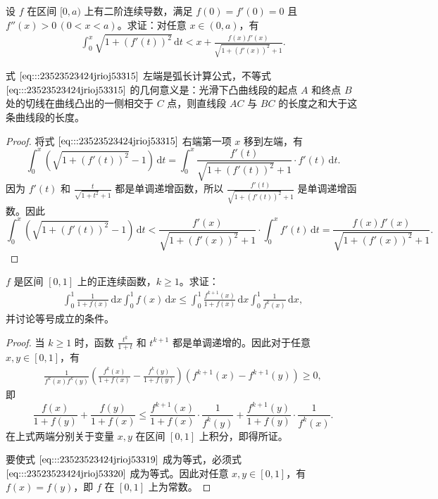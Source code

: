 \documentclass[../../main.tex]{subfiles}%
\begin{document}
\begin{proposition}
设 \( f \) 在区间 \([0,a)\) 上有二阶连续导数，满足 \( f(0) = f'(0) = 0 \) 且 \( f''(x) > 0 \, (0 < x < a) \)。求证：对任意 \( x \in (0,a) \)，有
\begin{align}
\int_{0}^{x} \sqrt{1 + (f'(t))^2} \, \mathrm{d}t < x + \frac{f(x)f'(x)}{\sqrt{1 + (f'(x))^2} + 1}. \label{eq:::23523523424jrioj53315}
\end{align}
\end{proposition}
\begin{remark}
式 \(\eqref{eq:::23523523424jrioj53315}\) 左端是弧长计算公式，不等式 \(\eqref{eq:::23523523424jrioj53315}\) 的几何意义是：光滑下凸曲线段的起点 \( A \) 和终点 \( B \) 处的切线在曲线凸出的一侧相交于 \( C \) 点，则直线段 \( AC \) 与 \( BC \) 的长度之和大于这条曲线段的长度。
\end{remark}
\begin{proof}

将式 \(\eqref{eq:::23523523424jrioj53315}\) 右端第一项 \( x \) 移到左端，有
\[
\int_{0}^{x} \left( \sqrt{1 + (f'(t))^2} - 1 \right) \, \mathrm{d}t = \int_{0}^{x} \frac{f'(t)}{\sqrt{1 + (f'(t))^2} + 1} \cdot f'(t) \, \mathrm{d}t.
\]
因为 \( f'(t) \) 和 \( \frac{t}{\sqrt{1 + t^2} + 1} \) 都是单调递增函数，所以 \( \frac{f'(t)}{\sqrt{1 + (f'(t))^2} + 1} \) 是单调递增函数。因此
\[
\int_{0}^{x} \left( \sqrt{1 + (f'(t))^2} - 1 \right) \, \mathrm{d}t < \frac{f'(x)}{\sqrt{1 + (f'(x))^2} + 1} \cdot \int_{0}^{x} f'(t) \, \mathrm{d}t = \frac{f(x)f'(x)}{\sqrt{1 + (f'(x))^2} + 1}.
\]

\end{proof}

\begin{example}
\( f \) 是区间 \([0,1]\) 上的正连续函数，\( k \geqslant 1 \)。求证：
\begin{align}
\int_{0}^{1} \frac{1}{1 + f(x)} \, \mathrm{d}x \int_{0}^{1} f(x) \, \mathrm{d}x \leqslant \int_{0}^{1} \frac{f^{k + 1}(x)}{1 + f(x)} \, \mathrm{d}x \int_{0}^{1} \frac{1}{f^k(x)} \, \mathrm{d}x, \label{eq:::23523523424jrioj53319}
\end{align}
并讨论等号成立的条件。
\end{example}
\begin{proof}

当 \( k \geqslant 1 \) 时，函数 \( \frac{t^k}{1 + t} \) 和 \( t^{k + 1} \) 都是单调递增的。因此对于任意 \( x, y \in [0,1] \)，有
\begin{align}
\frac{1}{f^k(x)f^k(y)} \left( \frac{f^k(x)}{1 + f(x)} - \frac{f^k(y)}{1 + f(y)} \right) \left( f^{k + 1}(x) - f^{k + 1}(y) \right) \geqslant 0, \label{eq:::23523523424jrioj53320}
\end{align}
即
\[
\frac{f(x)}{1 + f(y)} + \frac{f(y)}{1 + f(x)} \leqslant \frac{f^{k + 1}(x)}{1 + f(x)} \cdot \frac{1}{f^k(y)} + \frac{f^{k + 1}(y)}{1 + f(y)} \cdot \frac{1}{f^k(x)}.
\]
在上式两端分别关于变量 \( x, y \) 在区间 \([0,1]\) 上积分，即得所证。

要使式 \(\eqref{eq:::23523523424jrioj53319}\) 成为等式，必须式 \(\eqref{eq:::23523523424jrioj53320}\) 成为等式。因此对任意 \( x, y \in [0,1] \)，有 \( f(x) = f(y) \)，即 \( f \) 在 \([0,1]\) 上为常数。

\end{proof}
\end{document}
